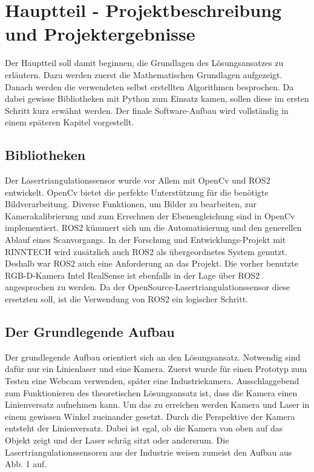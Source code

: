 \section{Hauptteil - Projektbeschreibung und Projektergebnisse}\label{ergebnisse}
Der Hauptteil soll damit beginnen, die Grundlagen des Lösungsansatzes zu erläutern. Dazu werden zuerst die Mathematischen Grundlagen aufgezeigt. Danach werden die verwendeten selbst erstellten Algorithmen besprochen. Da dabei gewisse Bibliotheken mit Python zum Einsatz kamen, sollen diese im ersten Schritt kurz erwähnt werden. Der finale Software-Aufbau wird vollständig in einem späteren Kapitel vorgestellt.
	
	\subsection{Bibliotheken}
	Der Lasertriangulationssensor wurde vor Allem mit OpenCv und ROS2 entwickelt. OpenCv bietet die perfekte Unterstützung für die benötigte Bildverarbeitung. Diverse Funktionen, um Bilder zu bearbeiten, zur Kamerakalibrierung und zum Errechnen der Ebenengleichung sind in OpenCv implementiert.
	ROS2 kümmert sich um die Automatisierung und den generellen Ablauf eines Scanvorgangs. In der Forschung und Entwicklungs-Projekt mit RINNTECH wird zusätzlich auch ROS2 als übergeordnetes System genutzt. Deshalb war ROS2 auch eine Anforderung an das Projekt. Die vorher benutzte RGB-D-Kamera Intel RealSense ist ebenfalls in der Lage über ROS2 angesprochen zu werden. Da der OpenSource-Lasertriangulationssensor diese ersetzten soll, ist die Verwendung von ROS2 ein logischer Schritt.
	
	\subsection{Der Grundlegende Aufbau}
	Der grundlegende Aufbau orientiert sich an den Lösungsansatz. Notwendig sind dafür nur ein Linienlaser und eine Kamera. Zuerst wurde für einen Prototyp zum Testen eine Webcam verwenden, später eine Industriekamera. Ausschlaggebend zum Funktionieren des theoretischen Lösungsansatz ist, dass die Kamera einen Linienversatz aufnehmen kann. Um das zu erreichen werden Kamera und Laser in einem gewissen Winkel zueinander gesetzt. Durch die Perspektive der Kamera entsteht der Linienversatz. Dabei ist egal, ob die Kamera von oben auf das Objekt zeigt und der Laser schräg sitzt oder andersrum. Die Lasertriangulationssensoren aus der Industrie weisen zumeist den Aufbau aus Abb. 1 auf.
	
